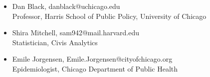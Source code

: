 \documentclass[margin,line]{resume}
\begin{document}
\begin{resume}
\begin{itemize}
        \item Dan Black, danblack@uchicago.edu \\
                Professor, Harris School of Public Policy, University of Chicago
        \item Shira Mitchell, sam942@mail.harvard.edu \\
                Statistician, Civis Analytics
	\item Emile Jorgensen, Emile.Jorgensen@cityofchicago.org \\
		Epidemiologist, Chicago Department of Public Health
		\end{itemize}
\end{resume}
\end{document}
